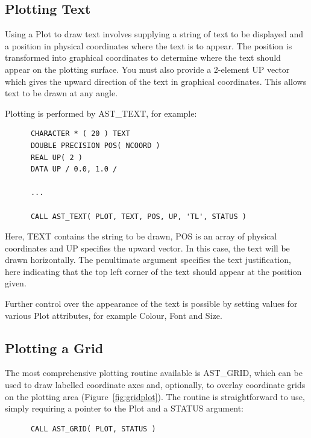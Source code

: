 \documentclass[twoside,11pt]{article}
\newcommand{\htmlref}[2]{#1}
\begin{document}
\subsection{Plotting Text}

Using a \htmlref{Plot}{Plot} to draw text involves supplying a string of text to be
displayed and a position in physical coordinates where the text is to
appear. The position is transformed into graphical coordinates to
determine where the text should appear on the plotting surface. You
must also provide a 2-element UP vector which gives the upward
direction of the text in graphical coordinates. This allows text to be
drawn at any angle.

Plotting is performed by \htmlref{AST\_TEXT}{AST_TEXT}, for example:

\small
\begin{verbatim}
      CHARACTER * ( 20 ) TEXT
      DOUBLE PRECISION POS( NCOORD )
      REAL UP( 2 )
      DATA UP / 0.0, 1.0 /

      ...

      CALL AST_TEXT( PLOT, TEXT, POS, UP, 'TL', STATUS )
\end{verbatim}
\normalsize

Here, TEXT contains the string to be drawn, POS is an array of
physical coordinates and UP specifies the upward vector. In this case,
the text will be drawn horizontally. The penultimate argument
specifies the text justification, here indicating that the top left
corner of the text should appear at the position given.

Further control over the appearance of the text is possible by setting
values for various Plot attributes, for example Colour, Font and Size.

\subsection{\label{ss:plottingagrid}Plotting a Grid}

The most comprehensive plotting routine available is \htmlref{AST\_GRID}{AST_GRID}, which
can be used to draw labelled coordinate axes and, optionally, to
overlay coordinate grids on the plotting area
(Figure~\ref{fig:gridplot}). The routine is straightforward to use,
simply requiring a pointer to the \htmlref{Plot}{Plot} and a STATUS argument:

\small
\begin{verbatim}
      CALL AST_GRID( PLOT, STATUS )
\end{verbatim}
\normalsize
\end{document}
